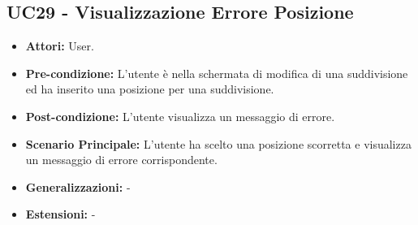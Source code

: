 \subsection{UC29 - Visualizzazione Errore Posizione}
\begin{itemize}
    \item \textbf{Attori:} User.
    \item \textbf{Pre-condizione:}  L'utente è nella schermata di modifica di una  suddivisione ed ha inserito una posizione per una suddivisione.
    \item \textbf{Post-condizione:} L'utente visualizza un messaggio di errore.
    \item \textbf{Scenario Principale:} L'utente ha scelto una posizione scorretta e visualizza un messaggio di errore corrispondente.
    \item \textbf{Generalizzazioni:} -
    \item \textbf{Estensioni:} -
\end{itemize}